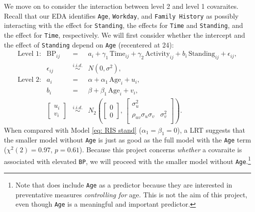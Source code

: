 \documentclass[12pt,twoside,letterpaper]{article}
\theoremstyle{definition}
\theoremstyle{definition}
\begin{document}
We move on to consider the interaction between level 2 and level 1 covaraites. Recall that our EDA identifies \texttt{Age}, \texttt{Workday}, and \texttt{Family History} as possibly interacting with the effect for \texttt{Standing}, the effects for \texttt{Time} and \texttt{Standing}, and the effect for \texttt{Time}, respectively. We will first consider whether the intercept and the effect of \texttt{Standing} depend on \texttt{Age} (recentered at 24):
\begin{equation}\label{eq: RIS stand age}
    \begin{array}{rrcll}
        \text{Level 1}: & \text{BP}_{ij} &=& a_i + \gamma_1\, \text{Time}_{ij} + \gamma_2\, \text{Activity}_{ij} + b_i\, \text{Standing}_{ij} + \epsilon_{ij}, \\[0.5ex]
         & \epsilon_{ij} &\overset{i.i.d.}{\sim}& N(0, \sigma^2), \\[0.5ex]
        \text{Level 2}: & a_i &=& \alpha + \alpha_1\, \text{Age}_i + u_i, \\[0.5ex]
         & b_i &=& \beta + \beta_1\, \text{Age}_i + v_i, \\[1ex]
         & \begin{bmatrix} u_i \\ v_i 
         \end{bmatrix} &\overset{i.i.d.}{\sim}& N_2\left(\begin{bmatrix} 0 \\ 0 \end{bmatrix},\, \begin{bmatrix} \sigma_u^2 &\\ 
         \rho_{uv}\sigma_u\sigma_v & \sigma_v^2\\
         \end{bmatrix} \right).
    \end{array}
\end{equation}
When compared with Model \ref{eq: RIS stand} ($\alpha_1 = \beta_1 = 0$), a LRT suggests that the smaller model without \texttt{Age} is just as good as the full model with the \texttt{Age} term ($\chi^2 (2) = 0.97$, $p = 0.61$). Because this project concerns \emph{whether} a covaraite is associated with elevated \texttt{BP}, we will proceed with the smaller model without \texttt{Age}.\footnote{Note that \citet{goldstein_ambulatory_2000} does include \texttt{Age} as a predictor because they are interested in preventative measures \emph{controlling for} age. This is not the aim of this project, even though \texttt{Age} is a meaningful and important predictor.} 
\end{document}
